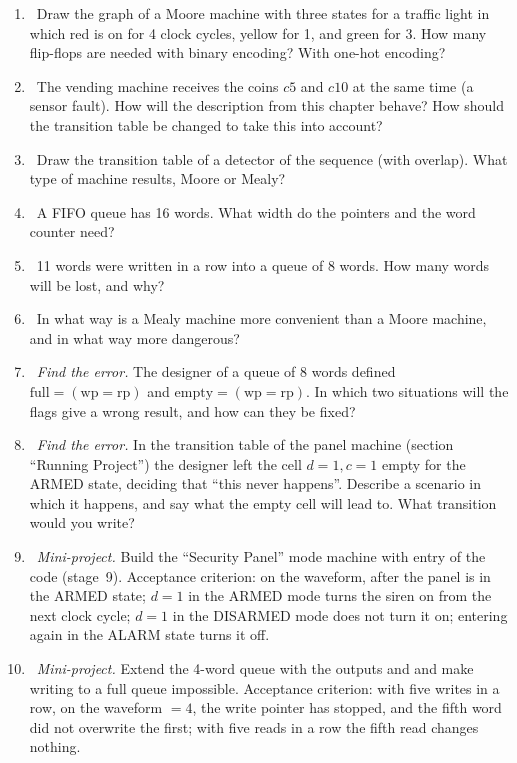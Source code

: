 \begin{taskbox}
\begin{enumerate}
  \item {}~Draw the graph of a Moore machine with three states for a traffic light in which
        red is on for 4 clock cycles, yellow for 1, and green for 3. How many flip-flops
        are needed with binary encoding? With one-hot encoding?
  \item {}~The vending machine receives the coins $c5$ and $c10$ at the same time (a
        sensor fault). How will the description from this chapter behave? How should the
        transition table be changed to take this into account?
  \item {}~Draw the transition table of a detector of the sequence 
        (with overlap). What type of machine results, Moore or Mealy?
  \item {}~A FIFO queue has 16 words. What width do the pointers and
        the word counter need?
  \item {}~11 words were written in a row into a queue of 8 words. How many words will be
        lost, and why?
  \item {}~In what way is a Mealy machine more convenient than a Moore machine, and in what way more dangerous?
  \item {}~\emph{Find the error.} The designer of a queue of 8 words defined
        $\text{full}=(\text{wp}=\text{rp})$ and $\text{empty}=(\text{wp}=\text{rp})$. In which
        two situations will the flags give a wrong result, and how can they be fixed?
  \item {}~\emph{Find the error.} In the transition table of the panel machine
        (section ``Running Project'') the designer left the cell
        $d{=}1,c{=}1$ empty for the ARMED state, deciding that ``this never happens''. Describe a
        scenario in which it happens, and say what the empty
        cell will lead to. What transition would you write?
  \item {}~\emph{Mini-project.} Build the ``Security Panel'' mode machine
        with entry of the code  (stage~9). Acceptance criterion: on the waveform,
        after  the panel is in the ARMED state; $d=1$ in the ARMED mode
        turns the siren on from the next clock cycle; $d=1$ in the DISARMED mode does not
        turn it on; entering  again in the ALARM state turns it off.
  \item {}~\emph{Mini-project.} Extend the 4-word queue with the outputs
         and  and make writing to a full
        queue impossible. Acceptance criterion: with five writes in a row,
        on the waveform $=4$, the write pointer has stopped, and the fifth word did not
        overwrite the first; with five reads in a row the fifth read changes nothing.
\end{enumerate}
\end{taskbox}

